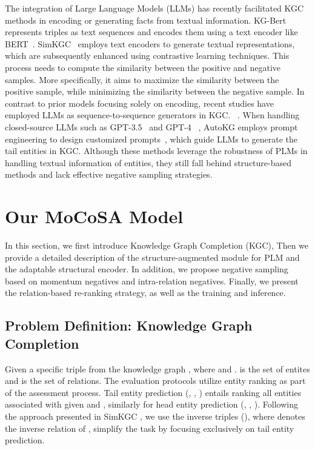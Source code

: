 \documentclass[11pt]{article}
\begin{document}
The integration of Large Language Models (LLMs) has recently facilitated KGC methods in encoding or generating facts from textual information. KG-Bert~\cite{yao2019kg} represents triples as text sequences and encodes them using a text encoder like BERT~\cite{devlin-etal-2019-bert}. SimKGC~\cite{Wang2022SimKGCSC} employs text encoders to generate textual representations, which are subsequently enhanced using contrastive learning techniques. This process needs to compute the similarity between the positive and negative samples. More specifically, it aims to maximize the similarity between the positive sample, while minimizing the similarity between the negative sample. In contrast to prior models focusing solely on encoding, recent studies have employed LLMs as sequence-to-sequence generators in KGC. ~\cite{Xie2022FromDT, Saxena2022SequencetoSequenceKG, Xie2022FromDT}. When handling closed-source LLMs such as GPT-3.5~\cite{Chen2020BigSM} and GPT-4 ~\cite{OpenAI2023GPT4TR}, AutoKG employs prompt engineering to design customized prompts~\cite{Zhu2023LLMsFK}, which guide LLMs to generate the tail entities in KGC. Although these methods leverage the robustness of PLMs in handling textual information of entities, they still fall behind structure-based methods and lack effective negative sampling strategies.


\section{Our MoCoSA Model}

In this section, we first introduce Knowledge Graph Completion (KGC), Then we provide a detailed description of the structure-augmented module for PLM and the adaptable structural encoder. In addition, we propose negative sampling based on momentum negatives and intra-relation negatives. Finally, we present the relation-based re-ranking strategy, as well as the training and inference.

\subsection{Problem Definition: Knowledge Graph Completion}

Given a specific triple  from the knowledge graph , where  and .  is the set of entites and  is the set of relations. The evaluation protocols utilize entity ranking as part of the assessment process. Tail entity prediction (, , ) entails ranking all entities associated with given  and , similarly for head entity prediction (, , ). Following the approach presented in SimKGC \cite{Wang2022SimKGCSC}, we use the inverse triples (), where  denotes the inverse relation of , simplify the task by focusing exclusively on tail entity prediction.
\end{document}
